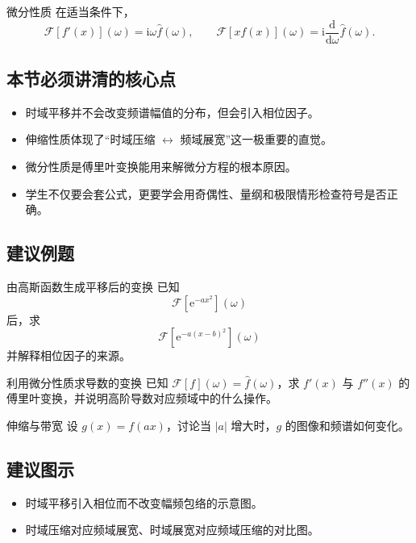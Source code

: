 \begin{dingli}{微分性质}{}
在适当条件下，
\[
    \mathcal{F}[f'(x)](\omega)=\mathrm{i}\omega \hat{f}(\omega),
    \qquad
    \mathcal{F}[x f(x)](\omega)=\mathrm{i}\frac{\mathrm{d}}{\mathrm{d}\omega}\hat{f}(\omega).
\]
\end{dingli}

\subsection*{本节必须讲清的核心点}
\begin{itemize}
    \item 时域平移并不会改变频谱幅值的分布，但会引入相位因子。
    \item 伸缩性质体现了``时域压缩 $\leftrightarrow$ 频域展宽''这一极重要的直觉。
    \item 微分性质是傅里叶变换能用来解微分方程的根本原因。
    \item 学生不仅要会套公式，更要学会用奇偶性、量纲和极限情形检查符号是否正确。
\end{itemize}

\subsection*{建议例题}
\begin{lizi}{由高斯函数生成平移后的变换}{}
已知
\[
    \mathcal{F}[\mathrm{e}^{-ax^2}](\omega)
\]
后，求
\[
    \mathcal{F}[\mathrm{e}^{-a(x-b)^2}](\omega)
\]
并解释相位因子的来源。
\end{lizi}

\begin{lizi}{利用微分性质求导数的变换}{}
已知 $\mathcal{F}[f](\omega)=\hat{f}(\omega)$，求 $f'(x)$ 与 $f''(x)$ 的傅里叶变换，并说明高阶导数对应频域中的什么操作。
\end{lizi}

\begin{lizi}{伸缩与带宽}{}
设 $g(x)=f(ax)$，讨论当 $|a|$ 增大时，$g$ 的图像和频谱如何变化。
\end{lizi}

\subsection*{建议图示}
\begin{itemize}
    \item 时域平移引入相位而不改变幅频包络的示意图。
    \item 时域压缩对应频域展宽、时域展宽对应频域压缩的对比图。
\end{itemize}

